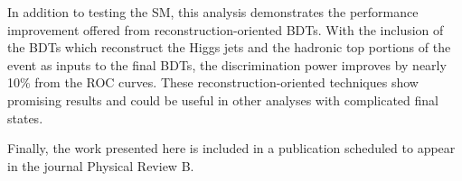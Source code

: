 In addition to testing the SM, this analysis demonstrates the performance improvement offered from reconstruction-oriented BDTs. With the inclusion of the BDTs
which reconstruct the Higgs jets and the hadronic top portions of the \tth event as inputs to the final BDTs,
the discrimination power improves by nearly 10$\%$ from the ROC curves. These reconstruction-oriented techniques show promising results and could be useful
in other analyses with complicated final states.

Finally, the work presented here is included in a publication scheduled to appear in the journal Physical Review B. 
